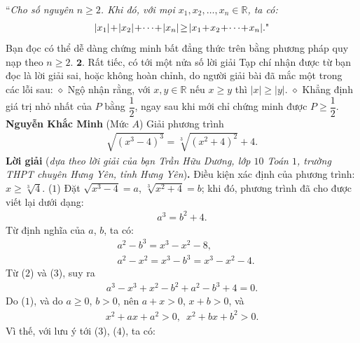 \begin{multicols}{2}
	\vskip 0.05cm
	``\textit{Cho số nguyên $n \ge 2$. Khi đó, với mọi  $x_1, x_2, \ldots,x_n \in \mathbb{R}$, ta có:}
	\begin{align*}
		|{x_1}| \!+\! |{x_2}| \!+\!  \cdots  \!+\! |{x_n}| \!\ge\! |{x_1} \!+\! {x_2} \!+\!  \cdots  \!+\! {x_n}|. \text{\color{black}"}
	\end{align*}
	Bạn đọc có thể dễ dàng chứng minh bất đẳng thức trên bằng phương pháp quy nạp theo $n \ge 2$.
	\vskip 0.05cm
	$\pmb{2.}$ Rất tiếc, có tới một nửa số lời giải Tạp chí nhận được từ bạn đọc là lời giải sai, hoặc không hoàn chỉnh, do người giải bài đã mắc một trong các lỗi sau:
	\vskip 0.05cm
	$\diamond$ Ngộ nhận rằng, với  $x,y \in \mathbb{R}$ nếu $x \ge y$ thì $|x|\ge |y|$.
	\vskip 0.05cm 
	$\diamond$ Khẳng định giá trị nhỏ nhất của $P$ bằng  $\dfrac{1}{2}$, ngay sau khi mới chỉ chứng minh được  $P \ge \dfrac{1}{2}$.
	\vskip 0.05cm
	\hfill	\textbf{\color{thachthuctoanhoc}Nguyễn Khắc Minh}
	\vskip 0.05cm
	{}
	(Mức $A$) Giải phương trình
	\begin{align*}
		\sqrt{(x^3-4)^3}=\sqrt[3]{(x^2+4)^2}+4.
	\end{align*} 
	\textbf{\color{thachthuctoanhoc}Lời giải} (\textit{dựa theo lời giải của bạn Trần Hữu Dương, lớp $10$ Toán $1$, trường THPT chuyên Hưng Yên, tỉnh Hưng Yên})\textbf{\color{thachthuctoanhoc}.}
	\vskip 0.05cm
	Điều kiện xác định của phương trình:\linebreak $x \ge \sqrt[3]{4}$. \hfill ($1$)
	\vskip 0.05cm
	Đặt $\sqrt {{x^3} - 4}  = a$,   $\sqrt[3]{{{x^2} + 4}} = b$; khi đó, phương trình đã cho được viết lại dưới dạng:
	\begin{align*}
		{a^3} = {b^2} + 4. \tag{$2$}
	\end{align*}
	Từ định nghĩa của $a$, $b$, ta có:
	\begin{align*}
		&{a^2} - {b^3} = {x^3} - {x^2} - 8, \tag{$3$}\\
		&{a^2} - {x^2} = {x^3} - {b^3} = {x^3} - {x^2} - 4.\tag{$4$}
	\end{align*}
	Từ ($2$) và ($3$), suy ra
	\begin{align*}
		{a^3} - {x^3} + {x^2} - {b^2} + {a^2} - {b^3} + 4 = 0. \tag{$5$}
	\end{align*}
	Do ($1$), và do $a \ge 0$, $b > 0$, nên $a + x > 0$, $x + b > 0$, và
	\begin{align*}
		{x^2} + ax + {a^2} > 0,\,\,\, {x^2} + bx + {b^2} > 0.
	\end{align*}
	Vì thế, với lưu ý tới ($3$), ($4$), ta có:
	\begin{align*}

\end{align*}
\end{multicols}
